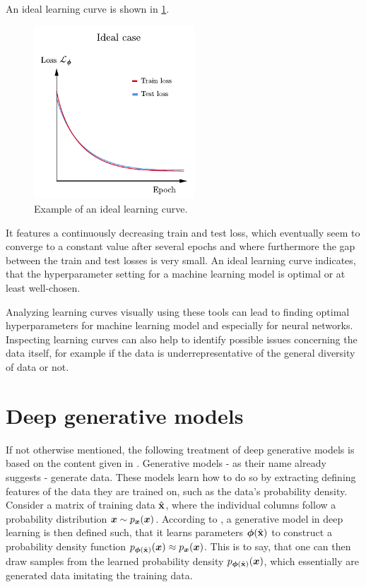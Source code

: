 \documentclass[a4paper,12pt]{report}
\def\lk#1{{\color{black}{#1}}}
\begin{document}
An ideal learning curve is shown in \cref{fig:ideallearningcurve}.
\begin{figure}[h]
\centering
\includegraphics[width=6cm]{figures/ideallearningcurve.pdf}
\caption{Example of an ideal learning curve.}
\label{fig:ideallearningcurve}
\end{figure}
It features a continuously decreasing train and test loss, which eventually seem to converge to a constant value after several epochs and where furthermore the gap between the train and test losses is very small. An ideal learning curve indicates, that the hyperparameter setting for a machine learning model is optimal or at least well-chosen.

Analyzing learning curves visually using these tools can lead to finding optimal hyperparameters for machine learning model\lk{s} and especially for neural networks. Inspecting learning curves can also help to identify possible issues concerning the data itself, for example if the \lk{training or testing} data is underrepresentative of the general diversity of data or not.

\section{Deep generative models}
If not otherwise mentioned, the following treatment of deep generative models is based on the content given in \cite{weng2018flow}. Generative models - as their name already suggests - generate data. These models learn how to do so by extracting defining features of the data they are trained on, such as the data's probability density. Consider a matrix of training data $\hat{\boldsymbol{\mathbf{x}}}$, where the individual columns follow a probability distribution $\bm{x} \sim p_{\bm{x}}(\bm{x})$. According to \cite[p.593]{Raschka.2022}, a generative model in deep learning is then defined such, that it learns parameters $\bm{\phi}(\hat{\boldsymbol{\mathbf{x}}})$ to construct a probability density function $p_{\bm{\phi}(\hat{\boldsymbol{\mathbf{x}}})}(\bm{x}) \approx p_{\bm{x}}(\bm{x})$. This is to say, that one can then draw samples from the learned probability density $p_{\bm{\phi}(\hat{\boldsymbol{\mathbf{x}}})}(\bm{x})$, which essentially are generated data imitating the training data.
\end{document}
